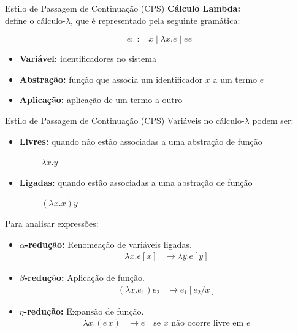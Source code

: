 \begin{frame}{Estilo de Passagem de Continuação (CPS)}
  \textbf{Cálculo Lambda:}\\
   define o cálculo-$\lambda$, que é representado pela seguinte gramática:

  \begin{equation}
    e ::= x \mid \lambda x. e \mid e e\nonumber
  \end{equation}

  \begin{itemize}
    \item \textbf{Variável:} identificadores no sistema
    \item \textbf{Abstração:} função que associa um identificador $x$ a um termo $e$
    \item \textbf{Aplicação:} aplicação de um termo a outro
  \end{itemize}
\end{frame}

\begin{frame}{Estilo de Passagem de Continuação (CPS)}
  Variáveis no cálculo-$\lambda$ podem ser:
  \begin{itemize}
    \item \textbf{Livres:} quando não estão associadas a uma abstração de função
          \begin{itemize}
            \item[--] $\lambda x. y$
          \end{itemize}
    \item \textbf{Ligadas:} quando estão associadas a uma abstração de função
          \begin{itemize}
            \item[--] $(\lambda x. x) y$
          \end{itemize}
    \item[]
  \end{itemize}

  Para analisar expressões:
  \begin{itemize}
    \item \textbf{$\alpha$-redução:} Renomeação de variáveis ligadas.
          \begin{align}
            \lambda x . e[x] & \rightarrow \lambda y . e[y]\nonumber
          \end{align}

    \item \textbf{$\beta$-redução:} Aplicação de função.
          \begin{align}
            (\lambda x . e_1) e_2 & \rightarrow e_1 [e_2 / x]\nonumber
          \end{align}

    \item \textbf{$\eta$-redução:} Expansão de função.
          \begin{align}
            \lambda x . (e \, x) & \rightarrow e \quad \text{se } x \text{ não ocorre livre em } e\nonumber
          \end{align}
  \end{itemize}
\end{frame}